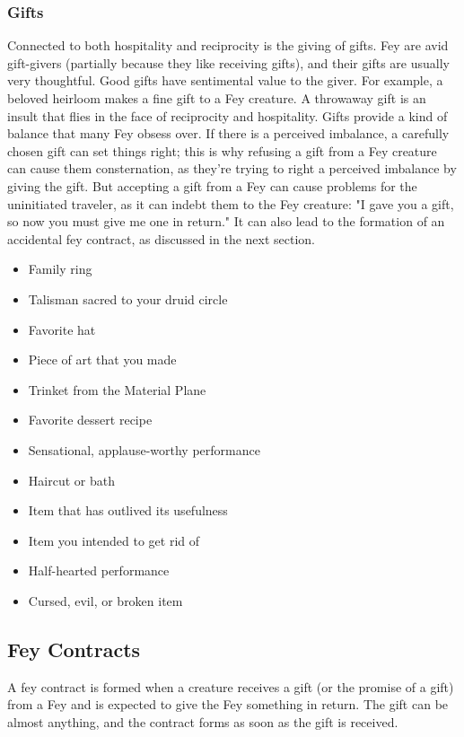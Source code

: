 \documentclass[10pt,a4paper,twoside,twocolumn,openany,nodeprecatedcode,bg=print]{dndbook}
\begin{document}
\subsubsection{Gifts}
Connected to both hospitality and reciprocity is the giving of gifts. Fey are avid gift-givers (partially because they like receiving gifts), and their gifts are usually very thoughtful. Good gifts have sentimental value to the giver. For example, a beloved heirloom makes a fine gift to a Fey creature. A throwaway gift is an insult that flies in the face of reciprocity and hospitality.
Gifts provide a kind of balance that many Fey obsess over. If there is a perceived imbalance, a carefully chosen gift can set things right; this is why refusing a gift from a Fey creature can cause them consternation, as they're trying to right a perceived imbalance by giving the gift. But accepting a gift from a Fey can cause problems for the uninitiated traveler, as it can indebt them to the Fey creature: "I gave you a gift, so now you must give me one in return." It can also lead to the formation of an accidental fey contract, as discussed in the next section.
\begin{itemize}

\item Family ring
\item Talisman sacred to your druid circle
\item Favorite hat
\item Piece of art that you made
\item Trinket from the Material Plane
\item Favorite dessert recipe
\item Sensational, applause-worthy performance
\item Haircut or bath
\end{itemize}


\begin{itemize}

\item Item that has outlived its usefulness
\item Item you intended to get rid of
\item Half-hearted performance
\item Cursed, evil, or broken item
\end{itemize}


\subsection{Fey Contracts}
A fey contract is formed when a creature receives a gift (or the promise of a gift) from a Fey and is expected to give the Fey something in return. The gift can be almost anything, and the contract forms as soon as the gift is received.
\end{document}
